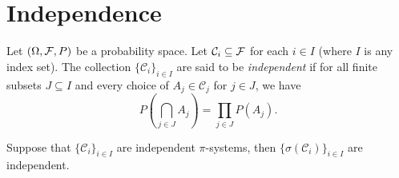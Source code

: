 \section{Independence}
\begin{defn}
    Let $({{\Omega}}, {\mathcal{F}}, P)$ be a probability space. Let $\mathcal{C}_i \subseteq {\mathcal{F}}$ for each $i \in I$ (where $I$ is any index set). The collection $\{\mathcal{C}_i\}_{i \in I}$ are said to be \emph{independent} if for all finite subsets $J \subseteq I$ and every choice of $A_j \in \mathcal{C}_j$ for $j \in J$, we have 
    \[P\left(\bigcap_{j \in J}A_j\right) = \prod_{j \in J}P(A_j). \] 
\end{defn}
\begin{thrm}
    Suppose that $\{\mathcal{C}_i\}_{i\in I}$ are independent $\pi$-systems, then $\{\sigma(\mathcal{C}_i)\}_{i \in I}$ are independent.
\end{thrm}
